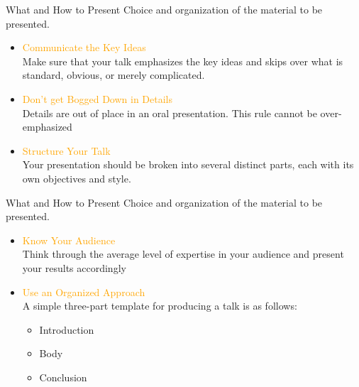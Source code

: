 \documentclass[
 size=14pt,
 paper=smartboard,  %
 mode=present, 		%
 display=slides, 	%
 style=tuliplab,  	%
 pauseslide,
 fleqn,leqno]{powerdot}
\begin{document}
\begin{slide}[toc=,bm=]{What and How to Present}
Choice and organization of the material to be presented.
\begin{itemize}
  \item \textcolor{orange}{Communicate the Key Ideas}\\
  Make sure that your talk emphasizes the key ideas and
  skips over what is standard,
  obvious,
  or merely complicated.
  \item \textcolor{orange}{Don't get Bogged Down in Details}\\
  Details are out of place in an oral presentation.
  This rule cannot be over-emphasized
  \item \textcolor{orange}{Structure Your Talk}\\
  Your presentation should be broken into several distinct parts,
  each with its own objectives and style.

\end{itemize}
\end{slide}

\begin{slide}[toc=,bm=]{What and How to Present}
Choice and organization of the material to be presented.
\begin{itemize}

  \item \textcolor{orange}{Know Your Audience}\\
  Think through the average level of expertise
  in your audience and present your results accordingly
  \item \textcolor{orange}{Use an Organized Approach}\\
  A simple three-part template for producing a talk is as follows:
  \begin{itemize}
    \item Introduction
    \item Body
    \item Conclusion
  \end{itemize}
  \end{itemize}
\end{slide}
\end{document}
